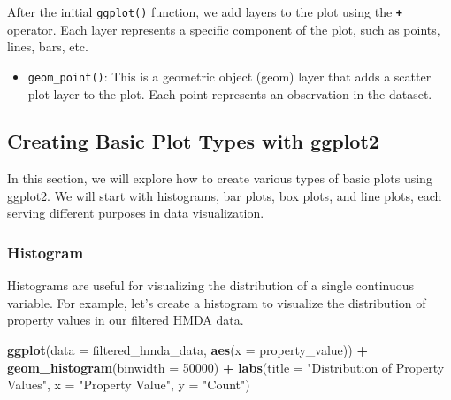 \documentclass[
]{book}
\newenvironment{Shaded}{\begin{snugshade}}{\end{snugshade}}
\newcommand{\AttributeTok}[1]{\textcolor[rgb]{0.13,0.29,0.53}{#1}}
\newcommand{\DecValTok}[1]{\textcolor[rgb]{0.00,0.00,0.81}{#1}}
\newcommand{\FunctionTok}[1]{\textcolor[rgb]{0.13,0.29,0.53}{\textbf{#1}}}
\newcommand{\NormalTok}[1]{#1}
\newcommand{\SpecialCharTok}[1]{\textcolor[rgb]{0.81,0.36,0.00}{\textbf{#1}}}
\newcommand{\StringTok}[1]{\textcolor[rgb]{0.31,0.60,0.02}{#1}}
\providecommand{\tightlist}{%
  \setlength{\itemsep}{0pt}\setlength{\parskip}{0pt}}
\begin{document}
After the initial \texttt{ggplot()} function, we add layers to the plot using the \textbf{\texttt{+}} operator. Each layer represents a specific component of the plot, such as points, lines, bars, etc.

\begin{itemize}
\tightlist
\item
  \texttt{geom\_point()}: This is a geometric object (geom) layer that adds a scatter plot layer to the plot. Each point represents an observation in the dataset.
\end{itemize}

\hypertarget{creating-basic-plot-types-with-ggplot2}{%
\subsection{Creating Basic Plot Types with ggplot2}\label{creating-basic-plot-types-with-ggplot2}}

In this section, we will explore how to create various types of basic plots using ggplot2. We will start with histograms, bar plots, box plots, and line plots, each serving different purposes in data visualization.

\hypertarget{histogram}{%
\subsubsection*{Histogram}\label{histogram}}

Histograms are useful for visualizing the distribution of a single continuous variable. For example, let's create a histogram to visualize the distribution of property values in our filtered HMDA data.

\begin{Shaded}
\begin{Highlighting}[]
\FunctionTok{ggplot}\NormalTok{(}\AttributeTok{data =}\NormalTok{ filtered\_hmda\_data, }\FunctionTok{aes}\NormalTok{(}\AttributeTok{x =}\NormalTok{ property\_value)) }\SpecialCharTok{+}
  \FunctionTok{geom\_histogram}\NormalTok{(}\AttributeTok{binwidth =} \DecValTok{50000}\NormalTok{) }\SpecialCharTok{+}
  \FunctionTok{labs}\NormalTok{(}\AttributeTok{title =} \StringTok{"Distribution of Property Values"}\NormalTok{,}
       \AttributeTok{x =} \StringTok{"Property Value"}\NormalTok{,}
       \AttributeTok{y =} \StringTok{"Count"}\NormalTok{)}
\end{Highlighting}
\end{Shaded}
\end{document}
